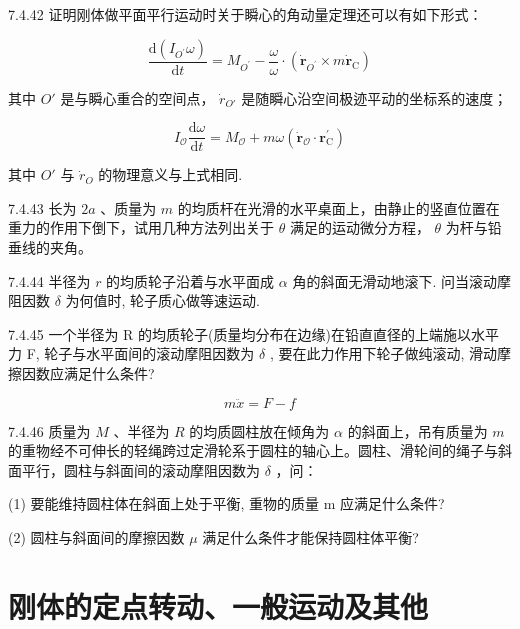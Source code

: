 \begin{problem}{7.4.42}
证明刚体做平面平行运动时关于瞬心的角动量定理还可以有如下形式：

\[
\frac {\mathrm{d} \left(I _ {O ^ {\prime}} \omega\right)}{\mathrm{d} t} = M _ {O ^ {\prime}} - \frac {\omega}{\omega} \cdot (\dot {\boldsymbol {r}} _ {O ^ {\prime}} \times m \dot {\boldsymbol {r}} _ {\mathrm{C}})
\]

其中 $O'$ 是与瞬心重合的空间点， $\dot{r}_{O'}$ 是随瞬心沿空间极迹平动的坐标系的速度；

\[
I _ {\mathcal {O}} \frac {\mathrm{d} \omega}{\mathrm{d} t} = M _ {\mathcal {O}} + m \omega (\dot {\boldsymbol {r}} _ {\mathcal {O}} \cdot \boldsymbol {r} _ {\mathrm{C}} ^ {\prime})
\]

其中 $O'$ 与 $\dot{r}_{O}$ 的物理意义与上式相同.
\end{problem}
\clearpage


\begin{problem}{7.4.43}
长为 $2a$ 、质量为 $m$ 的均质杆在光滑的水平桌面上，由静止的竖直位置在重力的作用下倒下，试用几种方法列出关于 $\theta$ 满足的运动微分方程， $\theta$ 为杆与铅垂线的夹角。
\end{problem}
\clearpage


\begin{problem}{7.4.44}
半径为 $r$ 的均质轮子沿着与水平面成 $\alpha$ 角的斜面无滑动地滚下. 问当滚动摩阻因数 $\delta$ 为何值时, 轮子质心做等速运动.
\end{problem}
\clearpage


\begin{problem}{7.4.45}
一个半径为 R 的均质轮子(质量均分布在边缘)在铅直直径的上端施以水平力 F, 轮子与水平面间的滚动摩阻因数为 $\delta$ , 要在此力作用下轮子做纯滚动, 滑动摩擦因数应满足什么条件?

\[
m \ddot {x} = F - f
\]
\end{problem}
\clearpage


\begin{problem}{7.4.46}
质量为 $M$ 、半径为 $R$ 的均质圆柱放在倾角为 $\alpha$ 的斜面上，吊有质量为 $m$ 的重物经不可伸长的轻绳跨过定滑轮系于圆柱的轴心上。圆柱、滑轮间的绳子与斜面平行，圆柱与斜面间的滚动摩阻因数为 $\delta$ ，问：

(1) 要能维持圆柱体在斜面上处于平衡, 重物的质量 m 应满足什么条件?

(2) 圆柱与斜面间的摩擦因数 $\mu$ 满足什么条件才能保持圆柱体平衡?
\end{problem}
\clearpage


\section{刚体的定点转动、一般运动及其他}

